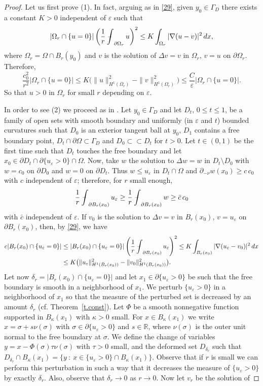 \documentclass[11pt]{amsart}
\theoremstyle{definition}
\theoremstyle{remark}
\numberwithin{equation}{section}
\newcommand{\R}{\mathbb{R}}
\newcommand{\avint}{\mathop{\,\rlap{--}\!\!\int}\nolimits}
\begin{document}
\begin{proof}
Let us first prove (1). In fact, arguing as in \eqref{29}, given $y_0\in\Gamma_D$ there exists a constant $K>0$ independent of $\varepsilon$ such that
\[
|\Omega_r\cap\{u=0\}|\left(\frac1r\avint_{\partial\Omega_r}u\right)^2\le K\int_{\Omega_r}|\nabla(u-v)|^2\,dx,
\]
where $\Omega_r=\Omega\cap B_r(y_0)$ and $v$ is the solution of $\Delta v=v$ in $\Omega_r$, $v=u$ on $\partial\Omega_r$. Therefore,
\[
\frac{c_0^2}{r^2}|\Omega_r\cap\{u=0\}|\le K\big(\|u\|^2_{H^1(\Omega_r)}-\|v\|^2_{H^1(\Omega_r)}\big)\le\frac C\varepsilon|\Omega_r\cap\{u=0\}|.
\]
So that $u>0$ in $\Omega_r$ for small $r$ depending on $\varepsilon$.

In order to see (2) we proceed as in \cite[Lemma~6]{AAC}. Let $y_0\in\Gamma_D$ and let $D_t$, $0\le t\le1$, be a family of open sets with smooth boundary and uniformly (in $\varepsilon$ and $t$) bounded curvatures such that $D_0$ is an exterior tangent ball at $y_0$, $D_1$ contains a free boundary point, $D_t\cap\partial\Omega\subset\Gamma_D$ and $D_0\subset\subset D_t$ for $t>0$. Let $t\in(0,1)$ be the first time such that $D_t$ touches the free boundary and let $x_0\in\partial D_t\cap\partial\{u_\varepsilon>0\}\cap\Omega$. Now, take $w$ the solution to $\Delta w=w$ in $D_t\setminus D_0$ with $w=c_0$ on $\partial D_0$ and $w=0$ on $\partial D_t$. Thus $w\le u_\varepsilon$ in $D_t\cap\Omega$ and $\partial_{-\nu}w(x_0)\ge c\,c_0$ with $c$ independent of $\varepsilon$; therefore, for $r$ small enough,
\[
\frac1r\avint_{\partial B_r(x_0)}u_\varepsilon\ge\frac1r\avint_{\partial B_r(x_0)}w\ge\bar c\,c_0
\]
with $\bar c$ independent of $\varepsilon$. If $v_0$ is the solution to $\Delta v=v$ in $B_r(x_0)$, $v=u_\varepsilon$ on $\partial B_r(x_0)$, then, by \eqref{29}, we have
\begin{align*}
c|B_r(x_0)\cap\{u_\varepsilon=0\}|&\le|B_r(x_0)\cap\{u_\varepsilon=0\}|\left(\frac1r\avint_{\partial B_r(x_0)}u_\varepsilon\right)^2\le K\int_{B_r(x_0)}|\nabla(u_\varepsilon-v_0)|^2\,dx\\
&\le K\big(\|u_\varepsilon\|^2_{H^1(B_r(x_0))}-\|v_0\|^2_{H^1(B_r(x_0))}\big).
\end{align*}
Let now $\delta_r=|B_r(x_0)\cap\{u_\varepsilon=0\}|$ and let $x_1\in\partial\{u_\varepsilon>0\}$ be such that the free boundary is smooth in a neighborhood of $x_1$. We perturb $\{u_\varepsilon>0\}$ in a neighborhood of $x_1$ so that the measure of the perturbed set is decreased by an amount $\delta_r$ (cf. Theorem~\ref{t.const}). Let $\Phi$ be a smooth nonnegative function supported in $B_\kappa(x_1)$ with $\kappa>0$ small. For $x\in B_\kappa(x_1)$ we write $x=\sigma+s\nu(\sigma)$ with $\sigma\in\partial\{u_\varepsilon>0\}$ and $s\in\R$, where $\nu(\sigma)$ is the outer unit normal to the free boundary at $\sigma$. We define the change of variables $y=x-\Phi(\sigma)\tau\nu(\sigma)$ with $\tau>0$ small, and the deformed set $D_{\delta_r}$ such that $D_{\delta_r}\cap B_\kappa(x_1)=\{y\ :\ x\in\{u_\varepsilon>0\}\cap B_\kappa(x_1)\}$. Observe that if $r$ is small we can perform this perturbation in such a way that it decreases the measure of $\{u_\varepsilon>0\}$ by exactly $\delta_r$. Also, observe that $\delta_r\to0$ as $r\to0$. Now let $v_r$ be the solution of

\end{proof}
\end{document}
